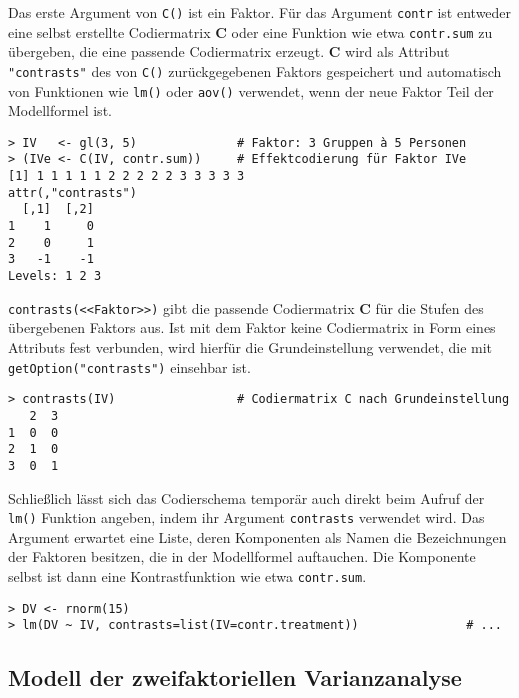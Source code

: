 Das erste Argument von \lstinline!C()! ist ein Faktor. Für das Argument \lstinline!contr! ist entweder eine selbst erstellte Codiermatrix $\bm{C}$ oder eine Funktion wie etwa \lstinline!contr.sum! zu übergeben, die eine passende Codiermatrix erzeugt. $\bm{C}$ wird als Attribut \lstinline!"contrasts"! des von \lstinline!C()! zurückgegebenen Faktors gespeichert und automatisch von Funktionen wie \lstinline!lm()! oder \lstinline!aov()! verwendet, wenn der neue Faktor Teil der Modellformel ist.
\begin{lstlisting}
> IV   <- gl(3, 5)              # Faktor: 3 Gruppen à 5 Personen
> (IVe <- C(IV, contr.sum))     # Effektcodierung für Faktor IVe
[1] 1 1 1 1 1 2 2 2 2 2 3 3 3 3 3
attr(,"contrasts")
  [,1]  [,2]
1    1     0
2    0     1
3   -1    -1
Levels: 1 2 3
\end{lstlisting}

\lstinline!contrasts(<<Faktor>>)! gibt die passende Codiermatrix $\bm{C}$ für die Stufen des übergebenen Faktors aus. Ist mit dem Faktor keine Codiermatrix in Form eines Attributs fest verbunden, wird hierfür die Grundeinstellung verwendet, die mit \lstinline!getOption("contrasts")! einsehbar ist.
\begin{lstlisting}
> contrasts(IV)                 # Codiermatrix C nach Grundeinstellung
   2  3
1  0  0
2  1  0
3  0  1
\end{lstlisting}

Schließlich lässt sich das Codierschema temporär auch direkt beim Aufruf der \lstinline!lm()! Funktion angeben, indem ihr Argument \lstinline!contrasts! verwendet wird. Das Argument erwartet eine Liste, deren Komponenten als Namen die Bezeichnungen der Faktoren besitzen, die in der Modellformel auftauchen. Die Komponente selbst ist dann eine Kontrastfunktion wie etwa \lstinline!contr.sum!.
\begin{lstlisting}
> DV <- rnorm(15)
> lm(DV ~ IV, contrasts=list(IV=contr.treatment))               # ...
\end{lstlisting}

\subsection{Modell der zweifaktoriellen Varianzanalyse}
\label{sec:multALManovaCRF}

